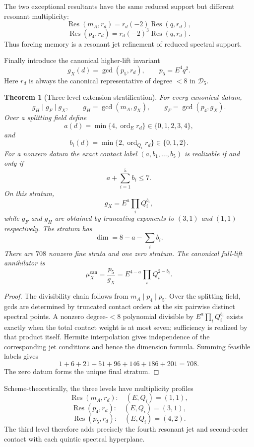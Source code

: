 \documentclass[11pt]{amsart}
\newtheorem{theorem}{Theorem}[section]
\begin{document}
The two exceptional resultants have the same reduced support but different resonant multiplicity:
\[
\operatorname{Res}(m_A,r_d)=r_d(-2)\operatorname{Res}(q,r_d),
\]
\[
\operatorname{Res}(p_4,r_d)=r_d(-2)^3\operatorname{Res}(q,r_d).
\]
Thus forcing memory is a resonant jet refinement of reduced spectral support.

Finally introduce the canonical higher-lift invariant
\[
g_X(d)=\gcd(p_5,r_d),
\qquad
p_5=E^4q^2.
\]
Here $r_d$ is always the canonical representative of degree $<8$ in $\mathscr D_5$.

\begin{theorem}[Three-level extension stratification]\label{thm:three-level}
For every canonical datum,
\[
\boxed{
g_H\mid g_F\mid g_X,
\qquad
g_H=\gcd(m_A,g_X),
\qquad
g_F=\gcd(p_4,g_X).
}
\]
Over a splitting field define
\[
a(d)=\min\{4,\operatorname{ord}_{E}r_d\}\in\{0,1,2,3,4\},
\]
and
\[
b_i(d)=\min\{2,\operatorname{ord}_{Q_i}r_d\}\in\{0,1,2\}.
\]
For a nonzero datum the exact contact label $(a,b_1,\ldots,b_5)$ is realizable if and only if
\[
\boxed{a+\sum_{i=1}^5b_i\le7.}
\]
On this stratum,
\[
\boxed{
g_X=E^a\prod_iQ_i^{b_i},
}
\]
while $g_F$ and $g_H$ are obtained by truncating exponents to $(3,1)$ and $(1,1)$ respectively.  The stratum has
\[
\boxed{
\dim=8-a-\sum_ib_i.
}
\]
There are $708$ nonzero fine strata and one zero stratum.  The canonical full-lift annihilator is
\[
\boxed{
\mu_X^{\mathrm{can}}=\frac{p_5}{g_X}
=E^{4-a}\prod_iQ_i^{2-b_i}.
}
\]
\end{theorem}

\begin{proof}
The divisibility chain follows from $m_A\mid p_4\mid p_5$.  Over the splitting field, gcds are determined by truncated contact orders at the six pairwise distinct spectral points.  A nonzero degree-$<8$ polynomial divisible by $E^a\prod_iQ_i^{b_i}$ exists exactly when the total contact weight is at most seven; sufficiency is realized by that product itself.  Hermite interpolation gives independence of the corresponding jet conditions and hence the dimension formula.  Summing feasible labels gives
\[
1+6+21+51+96+146+186+201=708.
\]
The zero datum forms the unique final stratum.
\end{proof}

Scheme-theoretically, the three levels have multiplicity profiles
\[
\operatorname{Res}(m_A,r_d):\quad (E,Q_i)=(1,1),
\]
\[
\operatorname{Res}(p_4,r_d):\quad (E,Q_i)=(3,1),
\]
\[
\operatorname{Res}(p_5,r_d):\quad (E,Q_i)=(4,2).
\]
The third level therefore adds precisely the fourth resonant jet and second-order contact with each quintic spectral hyperplane.
\end{document}
